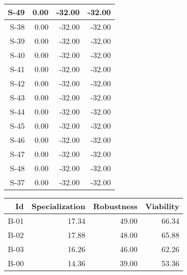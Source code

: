 \begin{tabular}{ | r | r | r | r | }
    \hline
                  S-49  &            0.00  &          -32.00  &          -32.00  \\
    \hline
                  S-38  &            0.00  &          -32.00  &          -32.00  \\
    \hline
                  S-39  &            0.00  &          -32.00  &          -32.00  \\
    \hline
                  S-40  &            0.00  &          -32.00  &          -32.00  \\
    \hline
                  S-41  &            0.00  &          -32.00  &          -32.00  \\
    \hline
                  S-42  &            0.00  &          -32.00  &          -32.00  \\
    \hline
                  S-43  &            0.00  &          -32.00  &          -32.00  \\
    \hline
                  S-44  &            0.00  &          -32.00  &          -32.00  \\
    \hline
                  S-45  &            0.00  &          -32.00  &          -32.00  \\
    \hline
                  S-46  &            0.00  &          -32.00  &          -32.00  \\
    \hline
                  S-47  &            0.00  &          -32.00  &          -32.00  \\
    \hline
                  S-48  &            0.00  &          -32.00  &          -32.00  \\
    \hline
                  S-37  &            0.00  &          -32.00  &          -32.00  \\
    \hline
\end{tabular}


\begin{tabular}{ | r | r | r | r | }
    \hline
                    Id  &  Specialization  &      Robustness  &       Viability  \\
    \hline
    \hline
                  B-01  &           17.34  &           49.00  &           66.34  \\
    \hline
                  B-02  &           17.88  &           48.00  &           65.88  \\
    \hline
                  B-03  &           16.26  &           46.00  &           62.26  \\
    \hline
                  B-00  &           14.36  &           39.00  &           53.36  \\
    \hline
\end{tabular}


